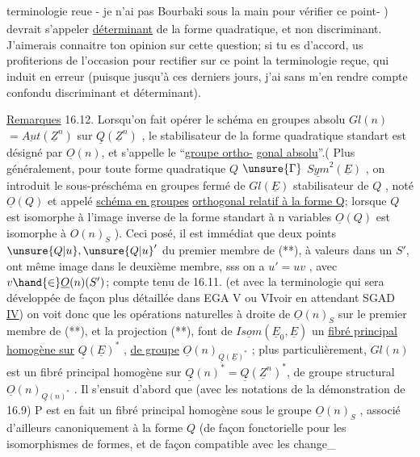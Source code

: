 
terminologie reu\textsubscript{\unsure{,}}e  - je n'ai pas Bourbaki sous la main pour vérifier ce
point- ) devrait s'appeler \uline{déterminant} de la forme quadratique, et non
discriminant. J'aimerais connaitre ton opinion sur cette question; si
tu es d'accord, us profiterions de l'occasion pour rectifier sur ce
point la terminologie reçue, qui induit en erreur (puisque jusqu'à ces
derniers jours, j'ai sans m'en rendre compte confondu discriminant et
déterminant).

\uline{Remarques} 16.12. Lorsqu'on fait opérer le schéma en groupes absolu
$Gl(n)$  $= \underline{Aut}(\underline{Z}^n )$ sur $\underline{Q}(\underline{Z}^n)$ , le stabilisateur de la forme
quadratique standart est désigné par $\underline{O}(n)$, et s'appelle le ``\uline{groupe ortho-}%
\uline{gonal absolu}''.( Plus généralement, pour toute forme quadratique $Q$ \hand{$\in$}
$\unsure{\Gamma}$ $\underline{Sym}^2(\underline{E})$ , on introduit le sous-préschéma en groupes fermé de
$Gl(\underline{E})$  stabilisateur de $Q$ , noté $\underline{O}(Q)$ et appelé \uline{schéma en groupes}
\uline{orthogonal relatif à la forme Q}; lorsque $Q$ est isomorphe à l'image
inverse de la forme standart à n variables\hand{,} $\underline{O}(Q)$ est isomorphe à $O(n)_S$ ). Ceci posé,
il est immédiat que deux points $\unsure{Q|u},\unsure{Q|u}'$ du premier membre de (**), à valeurs dans
un $S'$, ont même image dans le deuxième membre, sss 
 on a $u' = uv$ , avec $v \hand{\in} \underline{O}(n)(S')$; compte tenu de 16.11. (et
avec la terminologie qui sera développée de façon plus détaillée dans
EGA V ou VI\unsure{(}voir en attendant SGAD \uline{IV}\unsure{)}) on voit donc que les opérations naturelles à droite de
$\underline{O}(n)_S$ sur le premier membre de (**), et la projection (**), font de
$\underline{Isom}(\underline{E}_0,\underline{E})$ un \uline{fibré principal homogène sur} $\underline{Q}(\underline{E})^*$ , \uline{de groupe} $\underline{O}(n)_{\underline{Q}(\underline{E})^*}$ ;
plus particulièrement,  $Gl(n)$ est un fibré principal
homogène sur $\underline{Q}(n)^* = \underline{Q}(\underline{Z}^n)^*$, de groupe structural $\underline{O}(n)_{\underline{Q}(n)^*}$ . Il
s'ensuit  d'abord que (avec les notations de la démonstration de 16.9)
P est en fait un fibré principal homogène sous le groupe $\underline{O}(n)_S$ , associé
 d'ailleurs canoniquement à la forme $Q$ (de façon fonctorielle
pour les isomorphismes de formes, et de façon compatible avec les change\_%

